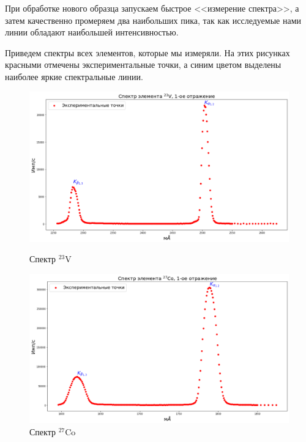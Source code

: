 \documentclass[a4paper, 12pt]{article}%
\begin{document}
		При обработке нового образца запускаем быстрое <<измерение спектра>>, а затем качественно промеряем два наибольших пика,  так как исследуемые нами линии обладают наибольшей интенсивностью.

		Приведем спектры всех элементов, которые мы измеряли.  На этих рисунках красными отмечены экспериментальные точки,  а синим цветом выделены наиболее яркие спектральные линии.

		\begin{figure}[h]
			\begin{minipage}[h]{0.49\textwidth}
				\begin{center}
					\includegraphics[width=1.02\linewidth]{Спектры/V.png}
					\caption{Спектр $^{23}$V}
				\end{center}
			\end{minipage}
			\hfill
			\begin{minipage}[h]{0.49\textwidth}
				\begin{center}
					\includegraphics[width=1.02\linewidth]{Спектры/Co.png}
					\caption{Спектр $^{27}$Co}
			\end{center}
			\end{minipage}
		\end{figure}
\end{document}
